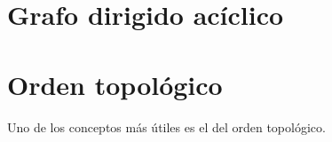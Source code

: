 \section{Grafo dirigido acíclico}

\section{Orden topológico}
Uno de los conceptos más útiles es el del orden topológico.